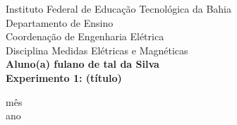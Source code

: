 \documentclass[a4paper, 12pt]{article}
\begin{document}

\begin{titlepage}
	\begin{center}
	

		\Large{Instituto Federal de Educação Tecnológica da Bahia}\\
		\large{Departamento de Ensino}\\ 
		\large{Coordenação de Engenharia Elétrica}\\ 
        \large{Disciplina Medidas Elétricas e Magnéticas}\\ 
        \vspace{115pt}
        \textbf{\Large{Aluno(a) fulano de tal da Silva }}\\
		\vspace{15pt}
        \vspace{95pt}
        \textbf{\Large{Experimento 1: (título) }}\\
		\vspace{3,5cm}
	\end{center}
	
	\vspace{1cm}
	
	\begin{center}
		\vspace{\fill}
			 mês\\
		 ano
			\end{center}
\end{titlepage}

\end{document}
